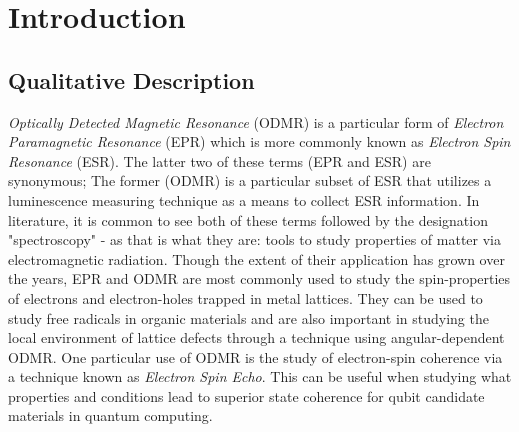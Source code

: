 \documentclass[oneside, astronomy, noacknowlegments]{BYUPhys}
\begin{document}
 \frontmatter

 \makepreliminarypages

 \tableofcontents

 \mainmatter




\chapter{Introduction}

\section{Qualitative Description}
\label{sec:qualitative}

\textit{Optically Detected Magnetic Resonance} (ODMR) is a particular form of \textit{Electron Paramagnetic Resonance} (EPR) which is more commonly known as \textit{Electron Spin Resonance} (ESR). The latter two of these terms (EPR and ESR) are synonymous; The former (ODMR) is a particular subset of ESR that utilizes a luminescence measuring technique as a means to collect ESR information. In literature, it is common to see both of these terms followed by the designation "spectroscopy" - as that is what they are: tools to study properties of matter via electromagnetic radiation. Though the extent of their application has grown over the years, EPR and ODMR are most commonly used to study the spin-properties of electrons and electron-holes trapped in metal lattices. They can be used to study free radicals in organic materials and are also important in studying the local environment of lattice defects through a technique using angular-dependent ODMR. One particular use of ODMR is the study of electron-spin coherence via a technique known as \textit{Electron Spin Echo}. This can be useful when studying what properties and conditions lead to superior state coherence for qubit candidate materials in quantum computing.
\end{document}
